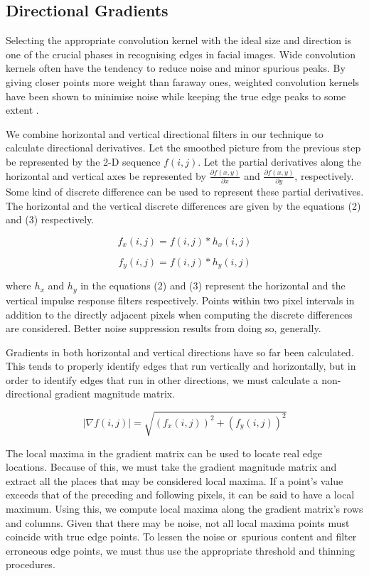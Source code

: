 \documentclass{70_styles/svproc}
\begin{document}
\subsection{Directional Gradients}
Selecting the appropriate convolution kernel with the ideal size and direction is one of the crucial phases in recognising edges in facial images. Wide convolution kernels often have the tendency to reduce noise and minor spurious peaks. By giving closer points more weight than faraway ones, weighted convolution kernels have been shown to minimise noise while keeping the true edge peaks to some extent \cite{Kanade-1977-15584}.

We combine horizontal and vertical directional filters in our technique to calculate directional derivatives. Let the smoothed picture from the previous step be represented by the 2-D sequence $f(i, j)$. Let the partial derivatives along the horizontal and vertical axes be represented by $\frac{\partial f(x, y)} {\partial x}$ and $\frac{\partial f(x, y)} {\partial y}$, respectively. Some kind of discrete difference can be used to represent these partial derivatives. The horizontal and the vertical discrete differences are given by the equations (2) and (3) respectively.

\begin{equation}
    f_x(i, j) = f(i, j) * h_x(i, j)
\end{equation}

\begin{equation}
    f_y(i, j) = f(i, j) * h_y(i, j)
\end{equation}

where $h_x$ and $h_y$ in the equations (2) and (3) represent the horizontal and the vertical impulse response filters respectively. Points within two pixel intervals in addition to the directly adjacent pixels when computing the discrete differences are considered. Better noise suppression results from doing so, generally. 

Gradients in both horizontal and vertical directions have so far been calculated. This tends to properly identify edges that run vertically and horizontally, but in order to identify edges that run in other directions, we must calculate a non-directional gradient magnitude matrix.

\begin{equation}
    |{\nabla f(i, j)}| = \sqrt{(f_x(i, j))^2 + (f_y(i, j))^2}
\end{equation}

The local maxima in the gradient matrix can be used to locate real edge locations. Because of this, we must take the gradient magnitude matrix and extract all the places that may be considered local maxima. If a point's value exceeds that of the preceding and following pixels, it can be said to have a local maximum. Using this, we compute local maxima along the gradient matrix's rows and columns. Given that there may be noise, not all local maxima points must coincide with true edge points. To lessen the noise or spurious content and filter erroneous edge points, we must thus use the appropriate threshold and thinning procedures.
\end{document}
